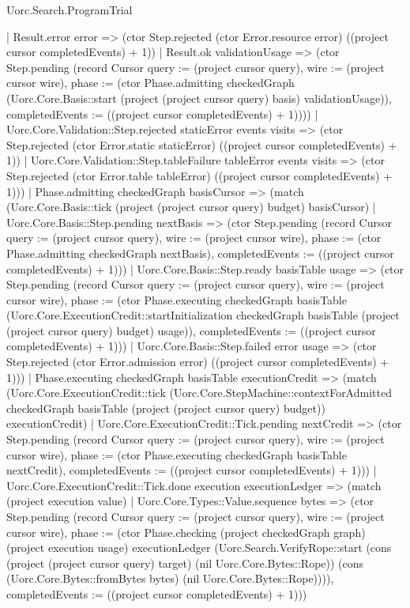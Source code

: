 \begin{lexlean}{Uorc.Search.ProgramTrial}
\begin{semanticmodule}
{        | Result.error error => (ctor Step.rejected (ctor Error.resource error) ((project cursor completedEvents) + 1))
        | Result.ok validationUsage => (ctor Step.pending (record Cursor {query := (project cursor query), wire := (project cursor wire), phase := (ctor Phase.admitting checkedGraph (Uorc.Core.Basis::start (project (project cursor query) basis) validationUsage)), completedEvents := ((project cursor completedEvents) + 1)})))
      | Uorc.Core.Validation::Step.rejected staticError events visits => (ctor Step.rejected (ctor Error.static staticError) ((project cursor completedEvents) + 1))
      | Uorc.Core.Validation::Step.tableFailure tableError events visits => (ctor Step.rejected (ctor Error.table tableError) ((project cursor completedEvents) + 1)))
    | Phase.admitting checkedGraph basisCursor => (match (Uorc.Core.Basis::tick (project (project cursor query) budget) basisCursor)
      | Uorc.Core.Basis::Step.pending nextBasis => (ctor Step.pending (record Cursor {query := (project cursor query), wire := (project cursor wire), phase := (ctor Phase.admitting checkedGraph nextBasis), completedEvents := ((project cursor completedEvents) + 1)}))
      | Uorc.Core.Basis::Step.ready basisTable usage => (ctor Step.pending (record Cursor {query := (project cursor query), wire := (project cursor wire), phase := (ctor Phase.executing checkedGraph basisTable (Uorc.Core.ExecutionCredit::startInitialization checkedGraph basisTable (project (project cursor query) budget) usage)), completedEvents := ((project cursor completedEvents) + 1)}))
      | Uorc.Core.Basis::Step.failed error usage => (ctor Step.rejected (ctor Error.admission error) ((project cursor completedEvents) + 1)))
    | Phase.executing checkedGraph basisTable executionCredit => (match (Uorc.Core.ExecutionCredit::tick (Uorc.Core.StepMachine::contextForAdmitted checkedGraph basisTable (project (project cursor query) budget)) executionCredit)
      | Uorc.Core.ExecutionCredit::Tick.pending nextCredit => (ctor Step.pending (record Cursor {query := (project cursor query), wire := (project cursor wire), phase := (ctor Phase.executing checkedGraph basisTable nextCredit), completedEvents := ((project cursor completedEvents) + 1)}))
      | Uorc.Core.ExecutionCredit::Tick.done execution executionLedger => (match (project execution value)
        | Uorc.Core.Types::Value.sequence bytes => (ctor Step.pending (record Cursor {query := (project cursor query), wire := (project cursor wire), phase := (ctor Phase.checking (project checkedGraph graph) (project execution usage) executionLedger (Uorc.Search.VerifyRope::start (cons (project (project cursor query) target) (nil Uorc.Core.Bytes::Rope)) (cons (Uorc.Core.Bytes::fromBytes bytes) (nil Uorc.Core.Bytes::Rope)))), completedEvents := ((project cursor completedEvents) + 1)}))
}
\end{semanticmodule}
\end{lexlean}
